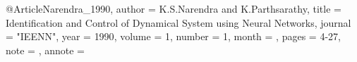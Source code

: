@Article{Narendra_1990,
  author =       {K.S.Narendra and K.Parthsarathy},
  title =        {Identification and Control of Dynamical System
                  using Neural Networks},
  journal =      "IEENN",
  year =         {1990},
  volume =    {1},
  number =    {1},
  month =     {},
  pages =     {4-27},
  note =      {},
  annote =    {}
}